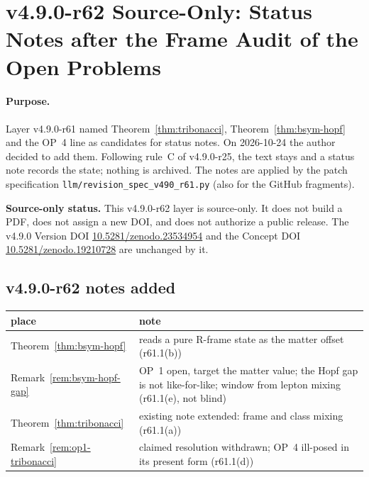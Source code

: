 \clearpage
\section*{v4.9.0-r62 Source-Only: Status Notes after the Frame Audit of the Open Problems}
\label{sec:v490-r62-op-status-notes}

\paragraph{Purpose.}
Layer v4.9.0-r61 named Theorem~\ref{thm:tribonacci}, Theorem~\ref{thm:bsym-hopf} and the OP~4 line as candidates for status notes.  On 2026-10-24 the author decided to add
them.  Following rule~C of v4.9.0-r25, the text stays and a status note records the state; nothing is archived.  The notes are applied by the patch specification
\texttt{llm/revision\_spec\_v490\_r61.py} (also for the GitHub fragments).

\noindent\textbf{Source-only status.}
This v4.9.0-r62 layer is source-only.  It does not build a PDF, does not assign a new DOI,
and does not authorize a public release.  The v4.9.0 Version DOI
\href{https://doi.org/10.5281/zenodo.23534954}{10.5281/zenodo.23534954} and the Concept DOI
\href{https://doi.org/10.5281/zenodo.19210728}{10.5281/zenodo.19210728} are unchanged by it.

\subsection*{v4.9.0-r62 notes added}
\label{subsec:v490-r62-notes}

\begin{center}
\small
\begin{tabular}{@{}>{\raggedright\arraybackslash}p{}>{\raggedright\arraybackslash}p{}@{}}
\toprule
place & note\\
\midrule
Theorem~\ref{thm:bsym-hopf} & reads a pure R-frame state as the matter offset (r61.1(b))\\
Remark~\ref{rem:bsym-hopf-gap} & OP~1 open, target the matter value; the Hopf gap is not like-for-like; window from lepton mixing (r61.1(e), not blind)\\
Theorem~\ref{thm:tribonacci} & existing note extended: frame and class mixing (r61.1(a))\\
Remark~\ref{rem:op1-tribonacci} & claimed resolution withdrawn; OP~4 ill-posed in its present form (r61.1(d))\\
\bottomrule
\end{tabular}
\end{center}

